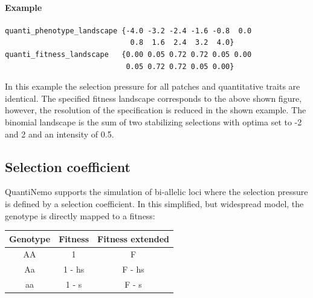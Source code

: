 \documentclass[letterpaper,12pt,oneside]{book}
\begin{document}
\paragraph{Example}\hspace*{\fill}
\begin{lstlisting}[frame=single]
quanti_phenotype_landscape {-4.0 -3.2 -2.4 -1.6 -0.8  0.0  
                             0.8  1.6  2.4  3.2  4.0}
quanti_fitness_landscape   {0.00 0.05 0.72 0.72 0.05 0.00 
                            0.05 0.72 0.72 0.05 0.00}    
\end{lstlisting}
In this example the selection pressure for all patches and quantitative traits are identical. The specified fitness landscape corresponds to the above shown figure, however, the resolution of the specification is reduced in the shown example. The binomial landscape is the sum of two stabilizing selections with optima set to -2 and 2 and an intensity of 0.5. 


\subsection{Selection coefficient}\label{sub:SelectionCoefficient}
QuantiNemo supports the simulation of bi-allelic loci where the selection pressure is defined by a selection coefficient. In this simplified, but widespread model, the genotype is directly mapped to a fitness:\\

\begin{tabular}{ccc}
 \hline            
Genotype & Fitness & Fitness extended \\
\hline
AA & 1             & F      \\
Aa & 1 - hs & F - hs \\
aa & 1 - s     & F - s  \\
\hline
\end{tabular}
\end{document}
